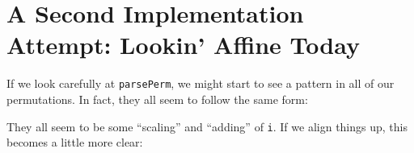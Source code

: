 \documentclass[]{article}
\newenvironment{Shaded}{}{}
\newcommand{\DataTypeTok}[1]{\textcolor[rgb]{0.56,0.13,0.00}{#1}}
\newcommand{\DecValTok}[1]{\textcolor[rgb]{0.25,0.63,0.44}{#1}}
\newcommand{\FunctionTok}[1]{\textcolor[rgb]{0.02,0.16,0.49}{#1}}
\newcommand{\NormalTok}[1]{#1}
\newcommand{\OperatorTok}[1]{\textcolor[rgb]{0.40,0.40,0.40}{#1}}
\newcommand{\OtherTok}[1]{\textcolor[rgb]{0.00,0.44,0.13}{#1}}
\newcommand{\StringTok}[1]{\textcolor[rgb]{0.25,0.44,0.63}{#1}}
\begin{document}
\section{A Second Implementation Attempt: Lookin' Affine
Today}\label{a-second-implementation-attempt-lookin-affine-today}

If we look carefully at \texttt{parsePerm}, we might start to see a pattern in
all of our permutations. In fact, they all seem to follow the same form:

\begin{Shaded}
\end{Shaded}

They all seem to be some ``scaling'' and ``adding'' of \texttt{i}. If we align
things up, this becomes a little more clear:

\begin{Shaded}
\end{Shaded}
\end{document}
